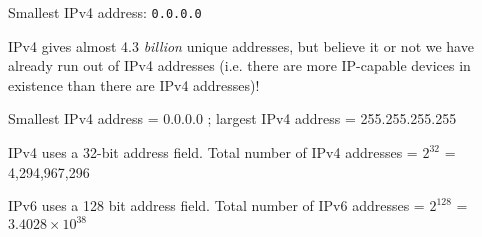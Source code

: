 \vskip 10pt

Smallest IPv4 address: {\tt 0.0.0.0}

\vskip 10pt

IPv4 gives almost 4.3 {\it billion} unique addresses, but believe it or not we have already run out of IPv4 addresses (i.e. there are more IP-capable devices in existence than there are IPv4 addresses)!







Smallest IPv4 address = 0.0.0.0  ;  largest IPv4 address = 255.255.255.255

IPv4 uses a 32-bit address field.  Total number of IPv4 addresses = $2^{32}$ = 4,294,967,296

\vskip 10pt

IPv6 uses a 128 bit address field.  Total number of IPv6 addresses = $2^{128}$ = $3.4028 \times 10^{38}$





